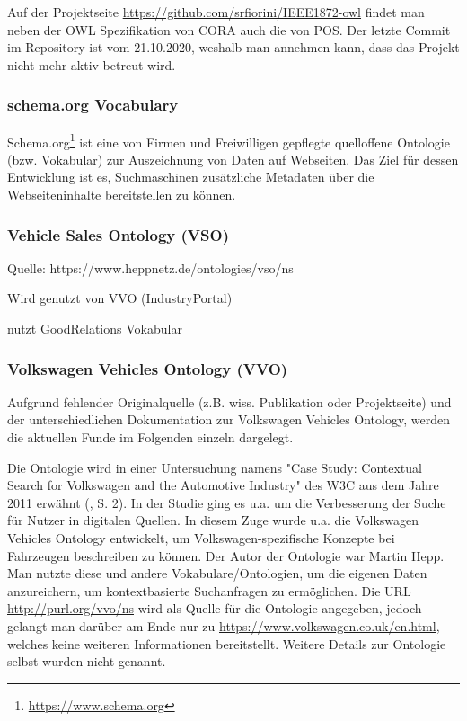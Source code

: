 \documentclass{article}
\begin{document}
Auf der Projektseite \url{https://github.com/srfiorini/IEEE1872-owl} findet man neben der OWL Spezifikation von CORA auch die von POS. Der letzte Commit im Repository ist vom 21.10.2020, weshalb man annehmen kann, dass das Projekt nicht mehr aktiv betreut wird.

\subsubsection{schema.org Vocabulary}

Schema.org\footnote{\url{https://www.schema.org}} ist eine von Firmen und Freiwilligen gepflegte quelloffene Ontologie (bzw. Vokabular) zur Auszeichnung von Daten auf Webseiten.
Das Ziel für dessen Entwicklung ist es, Suchmaschinen zusätzliche Metadaten über die Webseiteninhalte bereitstellen zu können.

\subsubsection{Vehicle Sales Ontology (VSO)}

Quelle: https://www.heppnetz.de/ontologies/vso/ns

Wird genutzt von VVO (IndustryPortal)

nutzt GoodRelations Vokabular

\subsubsection{Volkswagen Vehicles Ontology (VVO)}

Aufgrund fehlender Originalquelle (z.B. wiss. Publikation oder Projektseite) und der unterschiedlichen Dokumentation zur Volkswagen Vehicles Ontology, werden die aktuellen Funde im Folgenden einzeln dargelegt.

Die Ontologie wird in einer Untersuchung namens "Case Study: Contextual Search for Volkswagen and the Automotive Industry" des W3C aus dem Jahre 2011 erwähnt (\cite{greenly2011case}, S. 2).
In der Studie ging es u.a. um die Verbesserung der Suche für Nutzer in digitalen Quellen.
In diesem Zuge wurde u.a. die Volkswagen Vehicles Ontology entwickelt, um Volkswagen-spezifische Konzepte bei Fahrzeugen beschreiben zu können.
Der Autor der Ontologie war Martin Hepp.
Man nutzte diese und andere Vokabulare/Ontologien, um die eigenen Daten anzureichern, um kontextbasierte Suchanfragen zu ermöglichen.
Die URL \url{http://purl.org/vvo/ns} wird als Quelle für die Ontologie angegeben, jedoch gelangt man darüber am Ende nur zu \url{https://www.volkswagen.co.uk/en.html}, welches keine weiteren Informationen bereitstellt.
Weitere Details zur Ontologie selbst wurden nicht genannt.
\end{document}
